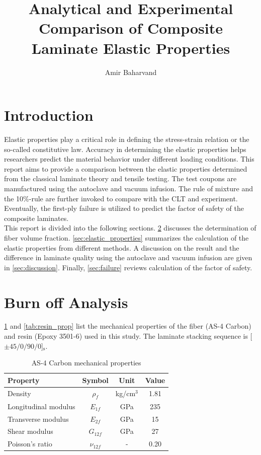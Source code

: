 \documentclass{article}
\title{Analytical and Experimental Comparison of Composite Laminate Elastic Properties}
\author{Amir Baharvand }
\date{}
\begin{document}
\maketitle

\tableofcontents

\section{Introduction}
Elastic properties play a critical role in defining the stress-strain relation or the so-called constitutive law. Accuracy in determining the elastic properties helps researchers predict the material behavior under different loading conditions. This report aims to provide a comparison between the elastic properties determined from the classical laminate theory and tensile testing. The test coupons are manufactured using the autoclave and vacuum infusion. The rule of mixture and the 10\%-rule are further invoked to compare with the CLT and experiment. Eventually, the first-ply failure is utilized to predict the factor of safety of the composite laminates. \\

This report is divided into the following sections. \cref{sect:burnoff} discusses the determination of fiber volume fraction. \cref{sec:elastic_properties} summarizes the calculation of the elastic properties from different methods. A discussion on the result and the difference in laminate quality using the autoclave and vacuum infusion are given in \cref{sec:discussion}. Finally, \cref{sec:failure} reviews calculation of the factor of safety.

\section{Burn off Analysis}\label{sect:burnoff}
\cref{tab:fiber_prop} and \cref{tab:resin_prop} list the mechanical properties of the fiber (AS-4 Carbon) and resin (Epoxy 3501-6) used in this study. The laminate stacking sequence is [$\pm45/0/90/0$]$_\text{s}$.

\begin{table}[H]
    \centering
    \begin{tabular}{lccc} \hline
        Property & Symbol & Unit & Value \\ \hline
        Density & $\rho_f$ & kg/cm$^3$ & 1.81 \\
        Longitudinal modulus & $E_{1f}$ & GPa & 235 \\
        Transverse modulus & $E_{2f}$ & GPa & 15 \\
        Shear modulus & $G_{12f}$ & GPa & 27 \\
        Poisson's ratio & $\nu_{12f}$ & - & 0.20 \\ \hline
    \end{tabular}
    \caption{AS-4 Carbon mechanical properties}
    \label{tab:fiber_prop}
\end{table}
\end{document}
